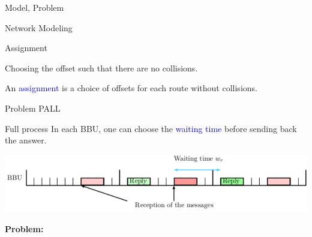 \documentclass[10 pt]{beamer}
\begin{document}
\begin{section}{Model, Problem}
\begin{subsection}{Network Modeling}
\begin{frame}{Assignment }
\begin{center}
{
}
\end{center}
\vspace{1cm}
\centering
Choosing the offset such that there are no collisions.
\vspace{0.5cm}

An \textcolor{blue}{assignment} is a choice of offsets for each route without collisions.
\end{frame}
\end{subsection}



\begin{subsection}{Problem PALL}
\begin{frame}{Full process}
In each BBU, one can choose the \textcolor{blue}{waiting time} before sending back the answer.\\

\begin{center}
  \includegraphics[scale=0.7]{BBU}\\
 \end{center} 

\textbf{Problem:}


\end{frame}
\end{subsection}
\end{section}
\end{document}
